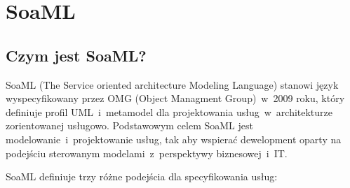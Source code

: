 \section{SoaML}
\subsection{Czym jest SoaML?}
SoaML (The Service oriented architecture Modeling Language) stanowi język wyspecyfikowany przez OMG (Object Managment Group)~w~2009 roku, który definiuje profil UML~i~metamodel dla projektowania usług~w~architekturze zorientowanej usługowo. Podstawowym celem SoaML jest modelowanie~i~projektowanie usług, tak aby wspierać dewelopment oparty na podejściu sterowanym modelami~z~perspektywy biznesowej~i~IT.

SoaML definiuje trzy różne podejścia dla specyfikowania usług: 
